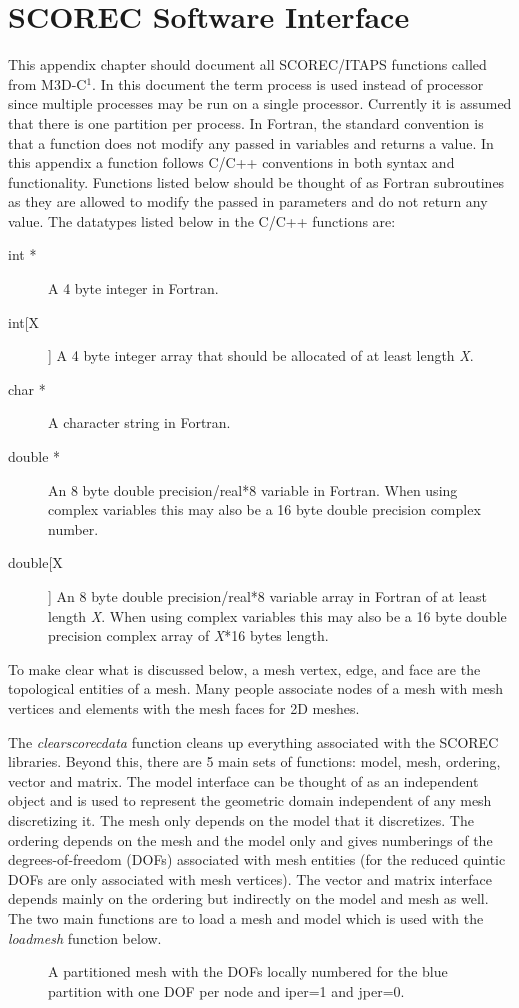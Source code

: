 \chapter{SCOREC Software Interface}
This appendix chapter should document all SCOREC/ITAPS functions called from M3D-C$^1$. 
In this document the term process is used instead of processor since multiple processes
may be run on a single processor.  Currently it is assumed that there is
one partition per process.  In Fortran, the standard convention
is that a function does not modify any passed in variables and returns a value. 
In this appendix a function follows C/C++ conventions in both syntax and functionality. 
Functions listed below should be thought of as Fortran subroutines as they are allowed
to modify the passed in parameters and do not return any value. 
The datatypes listed below in the C/C++ functions are:
\begin{description}
\item[int *] A 4 byte integer in Fortran.
\item[int[X]] A 4 byte integer array that should be allocated of at least length \textit{X}.
\item[char *] A character string in Fortran.
\item[double *] An 8 byte double precision/real*8 variable in Fortran. When using complex variables this may also be a 16 byte double precision complex number.  
\item[double[X]]  An 8 byte double precision/real*8 variable array in Fortran of at least length \textit{X}.  When using complex variables this may also be a 16 byte double precision complex array of \textit{X}*16 bytes length.
\end{description}
To make clear what is discussed below, a mesh vertex, edge, and face are the topological
entities of a mesh.  Many people associate nodes of a mesh with mesh vertices and elements with
the mesh faces for 2D meshes.  

The \textit{clearscorecdata} function cleans up everything associated with the SCOREC libraries.
Beyond this, there are 5 main sets of functions: model, mesh, ordering, vector and matrix.  The model
interface can be thought of as an independent object and is used to represent the geometric domain independent
of any mesh discretizing it.  The mesh only depends on the model that it discretizes.  The ordering
depends on the mesh and the model only and gives numberings of the degrees-of-freedom (DOFs) associated
with mesh entities (for the reduced quintic DOFs are only associated with mesh vertices).  The vector
and matrix interface depends mainly on the ordering but indirectly on the model and mesh as well.
 The two main functions
are to load a mesh and model which is used with the \textit{loadmesh} function below.  
\begin{center}
\begin{figure}
\centerline{} %
\caption{A partitioned mesh with the DOFs locally numbered for the blue partition with one DOF per node and iper=1 and jper=0.}\label{meshpartition} \end{figure}
\end{center}


